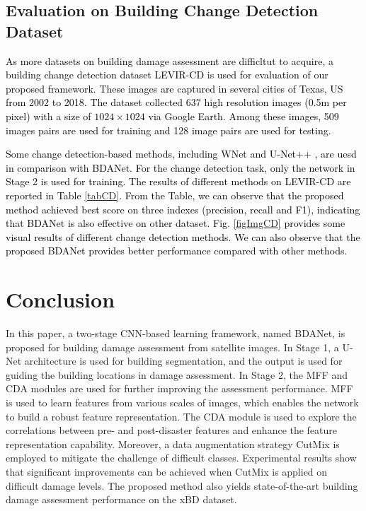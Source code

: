 \documentclass[journal]{IEEEtran}
\begin{document}
\subsection{Evaluation on Building Change Detection Dataset}
\textcolor{black}{As more datasets on building damage assessment are difficltut to acquire, a building change detection dataset LEVIR-CD \cite{chenSpatialTemporalAttentionBasedMethod2020} is used for evaluation of our proposed framework. These images are captured in several cities of Texas, US from 2002 to 2018. The dataset collected 637 high resolution images (0.5m per pixel) with a size of $1024\times 1024$ via Google Earth. Among these images, 509 images pairs are used for training and 128 image pairs are used for testing.}

\textcolor{black}{Some change detection-based methods, including WNet \cite{houWNetCDGANBitemporal2020} and U-Net++ \cite{pengEndtoEndChangeDetection2019}, are uesd in comparison with BDANet. For the change detection task, only the network in Stage 2 is used for training. The results of different methods on LEVIR-CD are reported in Table \ref{tabCD}. From the Table, we can observe that the proposed method achieved best score on three indexes (precision, recall and F1), indicating that BDANet is also effective on other dataset. Fig. \ref{figImgCD} provides some visual results of different change detection methods. We can also observe that the proposed BDANet provides better performance compared with other methods.}


\section{Conclusion}
\label{SecConclusion}
In this paper, a two-stage CNN-based learning framework, named BDANet, is proposed for building damage assessment from satellite images. In Stage 1, a U-Net architecture is used for building segmentation, and the output is used for guiding the building locations in damage assessment. In Stage 2, the MFF and CDA modules are used for further improving the assessment performance. MFF is used to learn features from various scales of images, which enables the network to build a robust feature representation. The CDA module is used to explore the correlations between pre- and post-disaster features and enhance the feature representation capability. Moreover, a data augmentation strategy CutMix is employed to mitigate the challenge of difficult classes. Experimental results show that significant improvements can be achieved when CutMix is applied on difficult damage levels. The proposed method also yields state-of-the-art building damage assessment performance on the xBD dataset.
\end{document}
